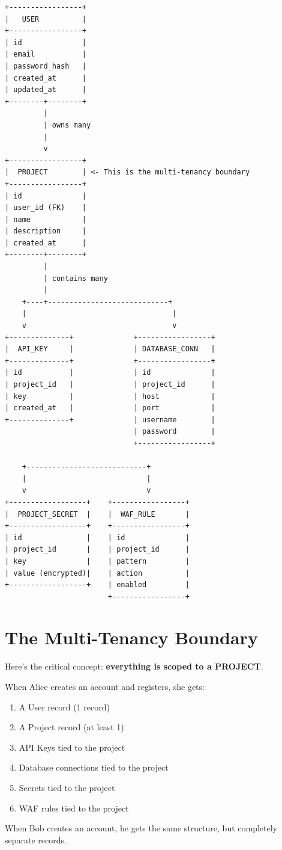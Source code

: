 \documentclass[11pt,a4paper]{report}
\begin{document}
\begin{lstlisting}[language=text]
+-----------------+
|   USER          |
+-----------------+
| id              |
| email           |
| password_hash   |
| created_at      |
| updated_at      |
+--------+--------+
         |
         | owns many
         |
         v
+-----------------+
|  PROJECT        | <- This is the multi-tenancy boundary
+-----------------+
| id              |
| user_id (FK)    |
| name            |
| description     |
| created_at      |
+--------+--------+
         |
         | contains many
         |
    +----+----------------------------+
    |                                  |
    v                                  v
+--------------+              +-----------------+
|  API_KEY     |              | DATABASE_CONN   |
+--------------+              +-----------------+
| id           |              | id              |
| project_id   |              | project_id      |
| key          |              | host            |
| created_at   |              | port            |
+--------------+              | username        |
                              | password        |
                              +-----------------+

    +----------------------------+
    |                            |
    v                            v
+------------------+    +-----------------+
|  PROJECT_SECRET  |    |  WAF_RULE       |
+------------------+    +-----------------+
| id               |    | id              |
| project_id       |    | project_id      |
| key              |    | pattern         |
| value (encrypted)|    | action          |
+------------------+    | enabled         |
                        +-----------------+
\end{lstlisting}


\section{The Multi-Tenancy Boundary}


Here's the critical concept: \textbf{everything is scoped to a PROJECT}.

When Alice creates an account and registers, she gets:
\begin{enumerate}
\item A User record (1 record)
\item A Project record (at least 1)
\item API Keys tied to the project
\item Database connections tied to the project
\item Secrets tied to the project
\item WAF rules tied to the project

\end{enumerate}
When Bob creates an account, he gets the same structure, but completely separate records.
\end{document}

